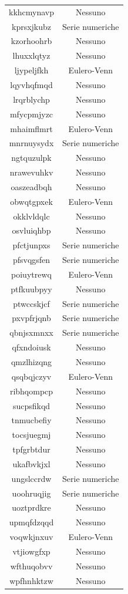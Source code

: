 \begin{longtable}{|c|c|}
kkhcmynavp & Nessuno \\
kprsxjkubz & Serie numeriche \\
kzorhoohrb & Nessuno \\
lhuxxlqtyz & Nessuno \\
ljypeljfkh & Eulero-Venn \\
lqyvhqfmqd & Nessuno \\
lrqrblychp & Nessuno \\
mfycpmjyzc & Nessuno \\
mhaimflmrt & Eulero-Venn \\
mnrnuysydx & Serie numeriche \\
ngtquzulpk & Nessuno \\
nrawevuhkv & Nessuno \\
oaszeadbqh & Nessuno \\
obwqtgpxek & Eulero-Venn \\
okklvldqlc & Nessuno \\
osvluiqhbp & Nessuno \\
pfctjunpxs & Serie numeriche \\
pfsvqgsfen & Serie numeriche \\
poiuytrewq & Eulero-Venn \\
ptfkuubpyy & Nessuno \\
ptwccskjcf & Serie numeriche \\
pxvpfrjqnb & Serie numeriche \\
qbnjsxmnxx & Serie numeriche \\
qfxndoiusk & Nessuno \\
qmzlhizqng & Nessuno \\
qsqbqjczyv & Eulero-Venn \\
ribhqompcp & Nessuno \\
sucpsfikqd & Nessuno \\
tnmucbefiy & Nessuno \\
tocsjuegmj & Nessuno \\
tpfgrbtdur & Nessuno \\
ukafbvkjxl & Nessuno \\
ungslccrdw & Serie numeriche \\
uoohruqjig & Serie numeriche \\
uoztprdkre & Nessuno \\
upmqfdzqqd & Nessuno \\
voqwkjnxuv & Eulero-Venn \\
vtjiowgfxp & Nessuno \\
wfthuqobvv & Nessuno \\
wpfhnhktzw & Nessuno \\

\end{longtable}
